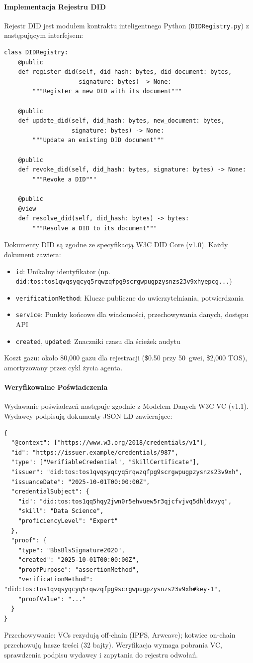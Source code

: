 \documentclass[11pt]{article}
\begin{document}
\paragraph{Implementacja Rejestru DID} Rejestr DID jest modułem kontraktu inteligentnego Python (\texttt{DIDRegistry.py}) z następującym interfejsem:
\begin{verbatim}
class DIDRegistry:
    @public
    def register_did(self, did_hash: bytes, did_document: bytes,
                     signature: bytes) -> None:
        """Register a new DID with its document"""

    @public
    def update_did(self, did_hash: bytes, new_document: bytes,
                   signature: bytes) -> None:
        """Update an existing DID document"""

    @public
    def revoke_did(self, did_hash: bytes, signature: bytes) -> None:
        """Revoke a DID"""

    @public
    @view
    def resolve_did(self, did_hash: bytes) -> bytes:
        """Resolve a DID to its document"""
\end{verbatim}
Dokumenty DID są zgodne ze specyfikacją W3C DID Core (v1.0). Każdy dokument zawiera:
\begin{itemize}[noitemsep]
  \item \texttt{id}: Unikalny identyfikator (np. \texttt{did:tos:tos1qvqsyqcyq5rqwzqfpg9scrgwpugpzysnzs23v9xhyepcg...})
  \item \texttt{verificationMethod}: Klucze publiczne do uwierzytelniania, potwierdzania
  \item \texttt{service}: Punkty końcowe dla wiadomości, przechowywania danych, dostępu API
  \item \texttt{created}, \texttt{updated}: Znaczniki czasu dla ścieżek audytu
\end{itemize}
Koszt gazu: około 80,000 gazu dla rejestracji (\$0.50 przy 50~gwei, \$2,000 TOS), amortyzowany przez cykl życia agenta.

\paragraph{Weryfikowalne Poświadczenia} Wydawanie poświadczeń następuje zgodnie z Modelem Danych W3C VC (v1.1). Wydawcy podpisują dokumenty JSON-LD zawierające:
\begin{verbatim}
{
  "@context": ["https://www.w3.org/2018/credentials/v1"],
  "id": "https://issuer.example/credentials/987",
  "type": ["VerifiableCredential", "SkillCertificate"],
  "issuer": "did:tos:tos1qvqsyqcyq5rqwzqfpg9scrgwpugpzysnzs23v9xh",
  "issuanceDate": "2025-10-01T00:00:00Z",
  "credentialSubject": {
    "id": "did:tos:tos1qq5hqy2jwn0r5ehvuew5r3qjcfvjvq5dhldxvyq",
    "skill": "Data Science",
    "proficiencyLevel": "Expert"
  },
  "proof": {
    "type": "BbsBlsSignature2020",
    "created": "2025-10-01T00:00:00Z",
    "proofPurpose": "assertionMethod",
    "verificationMethod": "did:tos:tos1qvqsyqcyq5rqwzqfpg9scrgwpugpzysnzs23v9xh#key-1",
    "proofValue": "..."
  }
}
\end{verbatim}
Przechowywanie: VCs rezydują off-chain (IPFS, Arweave); kotwice on-chain przechowują hasze treści (32 bajty). Weryfikacja wymaga pobrania VC, sprawdzenia podpisu wydawcy i zapytania do rejestru odwołań.
\end{document}
